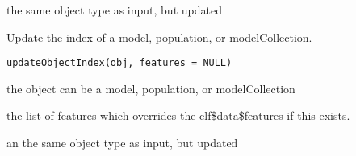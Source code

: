 \documentclass[a4paper]{book}
\begin{document}
%
\begin{Value}
the same object type as input, but updated
\end{Value}
%
\begin{Description}
Update the index of a model, population, or modelCollection.
\end{Description}
%
\begin{Usage}
\begin{verbatim}
updateObjectIndex(obj, features = NULL)
\end{verbatim}
\end{Usage}
%
\begin{Arguments}
\begin{ldescription}
\item[\code{obj:}] the object can be a model, population, or modelCollection

\item[\code{features:}] the list of features which overrides the clf\$data\$features if this exists.
\end{ldescription}
\end{Arguments}
%
\begin{Value}
an the same object type as input, but updated
\end{Value}
\printindex{}
\end{document}
